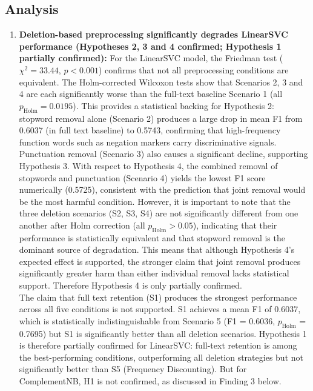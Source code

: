\documentclass[a4paper,10pt]{article}
\begin{document}
\subsection{Analysis}
\begin{enumerate}

    \item \textbf{Deletion-based preprocessing significantly degrades
    LinearSVC performance (Hypotheses 2, 3 and 4 confirmed; Hypothesis 1 partially confirmed):}
    For the LinearSVC model, the Friedman test ($\chi^2 = 33.44$,
    $p < 0.001$) confirms that not all preprocessing conditions are
    equivalent. The Holm-corrected Wilcoxon tests show that Scenarios 2,
    3 and 4 are each significantly worse than the full-text baseline
    Scenario 1 (all $p_{\text{Holm}} = 0.0195$). This provides a
    statistical backing for Hypothesis 2: stopword removal alone
    (Scenario 2) produces a large drop in mean F1 from 0.6037 (in full text baseline) to
    0.5743, confirming that high-frequency function words such as negation markers carry discriminative signals. Punctuation removal (Scenario 3) also causes a significant decline, supporting Hypothesis 3. With respect to Hypothesis 4, the combined removal of stopwords and punctuation (Scenario 4) yields the lowest F1 score numerically (0.5725), consistent with the prediction that joint removal would be the most harmful condition. However, it is important to note that the three deletion scenarios (S2, S3, S4) are not significantly different from one another after Holm correction (all $p_{\text{Holm}} > 0.05$), indicating that their performance is statistically equivalent and that stopword removal is the dominant source of degradation. This means that although Hypothesis 4’s expected effect is supported, the stronger claim that joint removal produces significantly greater harm than either individual removal lacks statistical support. Therefore Hypothesis 4 is only partially confirmed.\\
    The claim that full text retention (S1) produces the strongest performance across all five conditions is not supported. S1 achieves a mean F1 of 0.6037, which is statistically indistinguishable from Scenario 5 (F1 = 0.6036, $p_{\text{Holm}}$ = 0.7695) but S1 is significantly better than all deletion scenarios. Hypothesis 1 is therefore partially confirmed for LinearSVC: full-text retention is among the best-performing conditions, outperforming all deletion strategies but not significantly better than S5 (Frequency Discounting). But for ComplementNB, H1 is not confirmed, as discussed in Finding 3 below. 

\end{enumerate}
\end{document}
